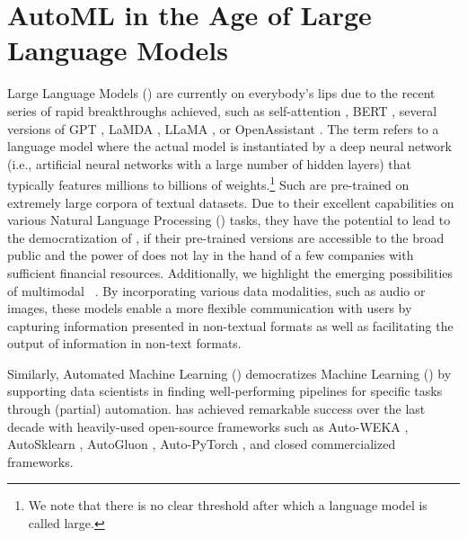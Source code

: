 
\chapter{AutoML in the Age of Large Language Models}
\label{human-centric-chap:llm}

Large Language Models (\LLMs) \cite{zhao-arxiv23a} are currently on everybody's lips due to the recent series of rapid breakthroughs achieved, such as self-attention \cite{vaswani-neurips17a}, BERT \cite{devlin-acl19a}, several versions of GPT \cite{radford-openai18a,radford-openai19a,brown-neurips20a,openai-openai22a,openai-openai23a}, LaMDA \cite{thoppilan-arxiv22a}, LLaMA \cite{touvren-arxiv23a}, or OpenAssistant \cite{koepf-arxiv23a}. The term \LLM refers to a language model where the actual model is instantiated by a deep neural network (i.e., artificial neural networks with a large number of hidden layers) that typically features millions to billions of weights.\footnote{We note that there is no clear threshold after which a language model is called large.} Such \LLMs are pre-trained on extremely large corpora of textual datasets. Due to their excellent capabilities on various Natural Language Processing (\NLP) tasks, they have the potential to lead to the democratization of \NLP, if their pre-trained versions are accessible to the broad public and the power of \LLMs does not lay in the hand of a few companies with sufficient financial resources. Additionally,  we highlight the emerging possibilities of multimodal \LLMs~\cite{yin-arxiv2023a, wu-arxiv2023a}. By incorporating various data modalities, such as audio or images, these models enable a more flexible communication with users by capturing information presented in non-textual formats as well as facilitating the output of information in non-text formats.

Similarly, Automated Machine Learning (\AutoML) \cite{hutter-book19a} democratizes Machine Learning (\ML) by supporting data scientists in finding well-performing \ML pipelines for specific tasks through (partial) automation. \AutoML has achieved remarkable success over the last decade with heavily-used open-source frameworks such as Auto-WEKA \cite{thornton-kdd13a,kotthoff-automlbook19a}, AutoSklearn \cite{feurer-automlbook19b,feurer-jmlr22a}, AutoGluon \cite{erickson-arxiv20a}, Auto-PyTorch \cite{zimmer-tpami21a}, and closed commercialized frameworks. 

